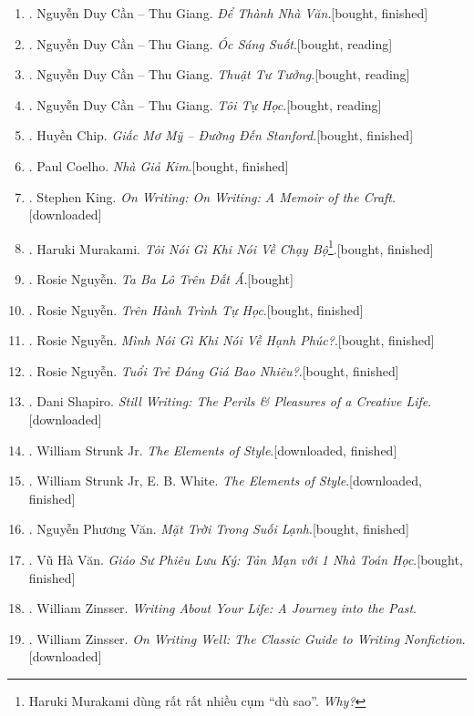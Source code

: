 \documentclass{article}
\begin{document}
\begin{enumerate}
	\item \cite{Can_dtnv}. Nguyễn Duy Cần -- Thu Giang. \textit{Để Thành Nhà Văn}.\hfill\textsf{[bought, finished]}
	\item \cite{Can_oss}. Nguyễn Duy Cần -- Thu Giang. \textit{Óc Sáng Suốt}.\hfill\textsf{[bought, reading]}
	\item \cite{Can_ttt}. Nguyễn Duy Cần -- Thu Giang. \textit{Thuật Tư Tưởng}.\hfill\textsf{[bought, reading]}
	\item \cite{Can_tth}. Nguyễn Duy Cần -- Thu Giang. \textit{Tôi Tự Học}.\hfill\textsf{[bought, reading]}
	\item \cite{Chip2018}. Huyền Chip. \textit{Giấc Mơ Mỹ -- Đường Đến Stanford}.\hfill\textsf{[bought, finished]}
	\item \cite{Coelho2023}. Paul Coelho. \textit{Nhà Giả Kim}.\hfill\textsf{[bought, finished]}
	\item \cite{King2000, King2010}. Stephen King. \textit{On Writing: On Writing: A Memoir of the Craft}.\hfill\textsf{[downloaded]}
	\item \cite{Murakami2023}. Haruki Murakami. \textit{Tôi Nói Gì Khi Nói Về Chạy Bộ}\footnote{Haruki Murakami dùng rất rất nhiều cụm ``dù sao''. \textit{Why?}}.\hfill\textsf{[bought, finished]}
	\item \cite{Rosie2021a}. Rosie Nguyễn. \textit{Ta Ba Lô Trên Đất Á}.\hfill\textsf{[bought]}
	\item \cite{Rosie2021b}. Rosie Nguyễn. \textit{Trên Hành Trình Tự Học}.\hfill\textsf{[bought, finished]}
	\item \cite{Rosie2022a}. Rosie Nguyễn. \textit{Mình Nói Gì Khi Nói Về Hạnh Phúc?}.\hfill\textsf{[bought, finished]}
	\item \cite{Rosie2022b}. Rosie Nguyễn. \textit{Tuổi Trẻ Đáng Giá Bao Nhiêu?}.\hfill\textsf{[bought, finished]}
	\item \cite{Shapiro2014}. Dani Shapiro. \textit{Still Writing: The Perils \& Pleasures of a Creative Life}.\hfill\textsf{[downloaded]}
	\item \cite{Strunk1918}. William Strunk Jr. \textit{The Elements of Style}.\hfill\textsf{[downloaded, finished]}
	\item \cite{Strunk_White2019}. William Strunk Jr, E. B. White. \textit{The Elements of Style}.\hfill\textsf{[downloaded, finished]}
	\item \cite{Van2022}. Nguyễn Phương Văn. \textit{Mặt Trời Trong Suối Lạnh}.\hfill\textsf{[bought, finished]}
	\item \cite{VanVu2022}. Vũ Hà Văn. \textit{Giáo Sư Phiêu Lưu Ký: Tản Mạn với 1 Nhà Toán Học}.\hfill\textsf{[bought, finished]}
	\item \cite{Zinsser2005}. William Zinsser. \textit{Writing About Your Life: A Journey into the Past}.
	\item \cite{Zinsser2016}. William Zinsser. \textit{On Writing Well: The Classic Guide to Writing Nonfiction}.\hfill\textsf{[downloaded]}
\end{enumerate}
\end{document}
